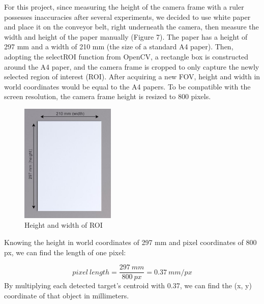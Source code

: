 \documentclass[10pt, letterpaper]{article}
\begin{document}
    For this project, since measuring the height of the camera frame with a ruler possesses inaccuracies after several experiments, we decided to use white paper and place it on the conveyor belt, right underneath the camera, then measure the width and height of the paper manually (Figure 7). The paper has a height of 297 mm and a width of 210 mm (the size of a standard A4 paper). Then, adopting the selectROI function from OpenCV, a rectangle box is constructed around the A4 paper, and the camera frame is cropped to only capture the newly selected region of interest (ROI). After acquiring a new FOV, height and width in world coordinates would be equal to the A4 papers. To be compatible with the screen resolution, the camera frame height is resized to 800 pixels.\par       
    \begin{figure}[h]
        \centering
        \includegraphics[width=0.4\textwidth]{fig7.JPG}
        \caption{Height and width of ROI}
    \end{figure}
    Knowing the height in world coordinates of 297 mm and pixel coordinates of 800 px, we can find the length of one pixel:\par
    \begin{equation} \label{eq9} pixel\:length = \frac{297\:mm}{800\:px} = 0.37\:mm/px \end{equation}
    By multiplying each detected target’s centroid with 0.37, we can find the (x, y) coordinate of that object in millimeters. \par
\end{document}
